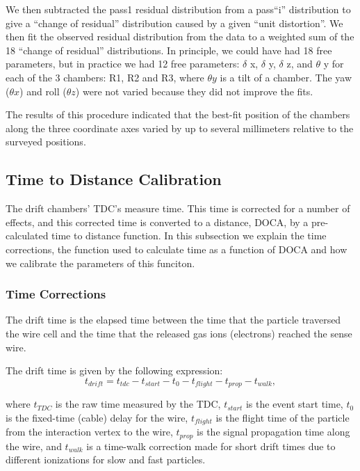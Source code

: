 We then subtracted the pass1 residual distribution from a pass``i'' distribution
to give a ``change of residual'' distribution caused by a given ``unit distortion''.
We then fit the observed residual distribution from the data to a weighted
sum of the 18 ``change of residual'' distributions.  In principle, we
could have had 18 free parameters, but in practice we had 12 free parameters:
 $\delta$ x, $\delta$ y, $\delta$ z, and $\theta$ y for each of the 3 chambers: R1, R2 and R3,
where $\theta y$ is a tilt of a chamber.  The yaw ($\theta x$) and roll ($\theta z$)
were not varied because they did not improve the fits.


The 
results of this procedure indicated that the best-fit position of the chambers 
along the three coordinate axes varied by up to several millimeters relative 
to the surveyed positions.  

\subsection{Time to Distance Calibration}
The drift chambers' TDC's measure time.  This time is corrected for a number
of effects, and this corrected time is converted to a distance, DOCA, by 
a pre-calculated time to distance function.  In this subsection we 
explain the time corrections, the function used to calculate time as a 
function of DOCA and how we calibrate the parameters of this funciton.

\subsubsection{Time Corrections}
The drift time is the elapsed time between the time that the particle 
traversed the wire cell and the time that the released gas ions (electrons)
reached the sense wire.

The drift time is given by the following expression:
\begin{equation} 
\label{drift}
t_{drift} = t_{tdc} - t_{start} - t_{0} - t_{flight} - t_{prop} - t_{walk},
\end{equation}

\noindent
where $t_{TDC}$ is the raw time measured by the TDC, $t_{start}$ is the event start time, 
$t_0$ is the fixed-time (cable) delay for the wire, $t_{flight}$ is the 
flight time of the particle from the interaction vertex to the wire, $t_{prop}$ 
is the signal propagation time along the wire, and $t_{walk}$ is a time-walk 
correction made for short drift times due to different ionizations for slow 
and fast particles.  

